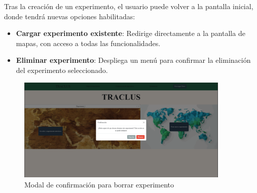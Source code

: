 Tras la creación de un experimento, el usuario puede volver a la pantalla inicial, donde tendrá nuevas opciones habilitadas:

\begin{itemize}
    \item \textbf{Cargar experimento existente}: Redirige directamente a la pantalla de mapas, con acceso a todas las funcionalidades.
    \item \textbf{Eliminar experimento}: Despliega un menú para confirmar la eliminación del experimento seleccionado.
\end{itemize}

\begin{figure}[H]
    \centering
    \includegraphics[width=0.9\textwidth]{img/Delete.png}
    \caption{Modal de confirmación para borrar experimento}
\end{figure}


